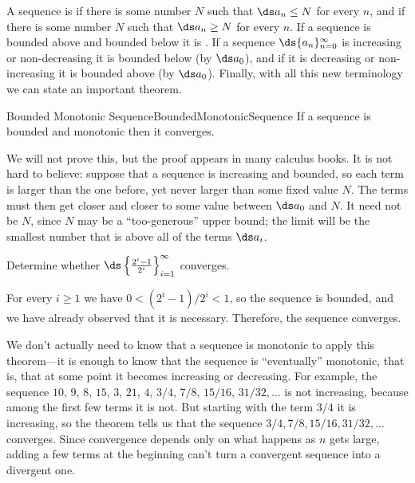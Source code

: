 A sequence is 
if there is some number $N$ such that $\ds a_n\le N$ for every $n$,
and  if there is
some number $N$ such that $\ds a_n\ge N$ for every $n$. If a sequence
is bounded above and bounded below it is . If a sequence $\ds
\{a_n\}_{n=0}^\infty$ is increasing or non-decreasing it is bounded
below (by $\ds a_0$), and if it is decreasing or non-increasing it is
bounded above (by $\ds a_0$).  Finally, with all this new terminology
we can state an important theorem.

\begin{theorem}{Bounded Monotonic Sequence}{BoundedMonotonicSequence}
If a sequence is bounded and monotonic then it converges.
\end{theorem}

We will not prove this, but the proof appears in many calculus books. It
is not hard to believe: suppose that a sequence is increasing and
bounded, so each term is larger than the one before, yet never larger
than some fixed value $N$. The terms must then get closer and closer
to some value between $\ds a_0$ and $N$. It need not be $N$, since $N$ may
be a ``too-generous'' upper bound; the limit will be the
smallest number that is above all of the terms $\ds a_i$.

\begin{example}{}{}
Determine whether $\ds\left\{\frac{2^i-1}{2^i}\right\}_{i=1}^{\infty}$ converges.
\end{example}
\begin{solution}
For every $i\geq 1$ we have $0<(2^i-1)/2^i<1$, so the sequence is bounded, and we have already observed that it is necessary. Therefore, the sequence converges.
\end{solution}

We don't actually need to know that a sequence is monotonic to apply
this theorem---it is enough to know that the sequence is
``eventually'' monotonic, that is, that at some point it becomes
increasing or decreasing. For example, the sequence $10$, $9$, $8$,
$15$, $3$, $21$, $4$, $3/4$, $7/8$, $15/16$, $31/32,\ldots$ is not
increasing, because among the first few terms it is not. But starting
with the term $3/4$ it is increasing, so the theorem tells us that the
sequence $3/4, 7/8, 15/16, 31/32,\ldots$ converges.  Since convergence
depends only on what happens as $n$ gets large, adding a few
terms at the beginning can't turn a convergent sequence into a
divergent one.

